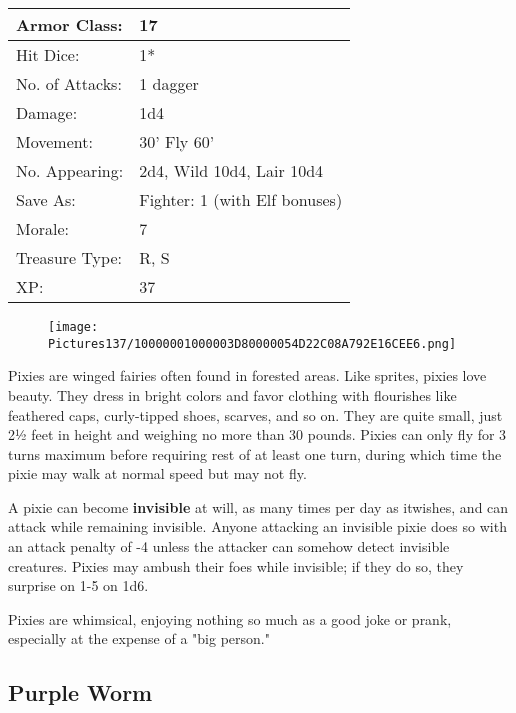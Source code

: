 \documentclass[a4paper,twoside,openany,10pt]{book}
\begin{document}
\begin{multicols}{2}
\begin{tabularx}{0.50\textwidth}{@{}lX@{}}
Armor Class: & 17 \\\hline
Hit Dice: & 1* \\\hline
No. of Attacks: & 1 dagger \\\hline
Damage: & 1d4 \\\hline
Movement: & 30' Fly 60' \\\hline
No. Appearing: & 2d4, Wild 10d4, Lair 10d4 \\\hline
Save As: & Fighter: 1 (with Elf bonuses) \\\hline
Morale: & 7 \\\hline
Treasure Type: & R, S \\\hline
XP: & 37 \\\hline
\end{tabularx}\medskip

\begin{wrapfigure}{l}{0.25\textwidth}
 \texttt{[image: Pictures137/10000001000003D80000054D22C08A792E16CEE6.png]} 
\end{wrapfigure}

Pixies are winged fairies often found in forested areas. Like sprites, pixies love beauty. They dress in bright colors and favor clothing with flourishes like feathered caps, curly-tipped shoes, scarves, and so on. They are quite small, just 2½ feet in height and weighing no more than 30 pounds. Pixies can only fly for 3 turns maximum before requiring rest of at least one turn, during which time the pixie may walk at normal speed but may not fly.

A pixie can become \textbf{invisible }at will, as many times per day as itwishes, and can attack while remaining invisible. Anyone attacking an invisible pixie does so with an attack penalty of -4 unless the attacker can somehow detect invisible creatures. Pixies may ambush their foes while invisible; if they do so, they surprise on 1-5 on 1d6. 

Pixies are whimsical, enjoying nothing so much as a good joke or prank, especially at the expense of a "big person."

\subsection*{Purple Worm}\label{purple-worm}


\end{multicols}
\end{document}
